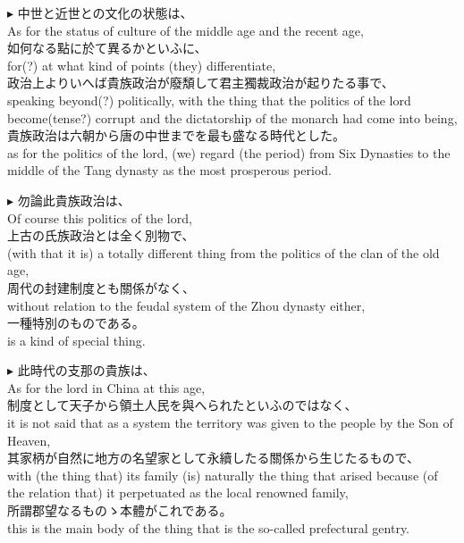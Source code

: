 \documentclass{ctexart}
\makeatletter
\newcommand*{\shifttext}[1]{%
  \settowidth{\@tempdima}{#1}%
  \hspace{-\@tempdima}#1%
}
\newcommand{\plabel}[1]{%
\shifttext{\textbf{#1}\quad}%
}
\newcommand{\prule}{%
\begin{center}%
\hdashrule[0.5ex]{.99\linewidth}{1pt}{1pt 2.5pt}%
\end{center}%
}
\makeatother
\begin{document}
\prule

\plabel{$\blacktriangleright$}%
中世と近世との文化の状態は、\\
As for the status of culture of the middle age and the recent age,\\
如何なる點に於て異るかといふに、\\
for(?) at what kind of points (they) differentiate,\\
政治上よりいへば貴族政治が廢頽して君主獨裁政治が起りたる事で、\\
speaking beyond(?) politically, with the thing that the politics of the lord become(tense?) corrupt and the dictatorship of the monarch had come into being,\\
貴族政治は六朝から唐の中世までを最も盛なる時代とした。\\
as for the politics of the lord, (we) regard (the period) from Six Dynasties to the middle of the Tang dynasty as the most prosperous period.

\vspace{1em}
\plabel{$\blacktriangleright$}%
勿論此貴族政治は、\\
Of course this politics of the lord,\\
上古の氏族政治とは全く別物で、\\
(with that it is) a totally different thing from the politics of the clan of the old age,\\
周代の封建制度とも關係がなく、\\
without relation to the feudal system of the Zhou dynasty either,\\
一種特別のものである。\\
is a kind of special thing.


\vspace{1em}
\plabel{$\blacktriangleright$}%
此時代の支那の貴族は、\\
As for the lord in China at this age,\\
制度として天子から領土人民を與へられたといふのではなく、\\
it is not said that as a system the territory was given to the people by the Son of Heaven,\\
其家柄が自然に地方の名望家として永續したる關係から生じたるもので、\\
with (the thing that) its family (is) naturally the thing that arised because (of the relation that) it perpetuated as the local renowned family,\\
所謂郡望なるものゝ本體がこれである。\\
this is the main body of the thing that is the so-called prefectural gentry.
\end{document}
